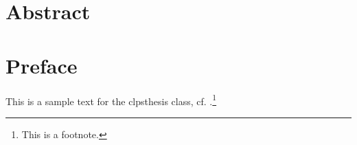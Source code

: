 \documentclass[11pt]{clpsthesis}
\begin{document}
\thesistitlepage

\dedication[to]{Someone important}

\frontmatter

\chapter{Abstract}
\newpage

\tableofcontents

\chapter{Preface}

This is a sample text for the \textsf{clpsthesis} class, cf. \cite{Author2020}.\footnote{This is a footnote.}

\mainmatter

\blinddocument

\backmatter

\printbibliography
\end{document}
